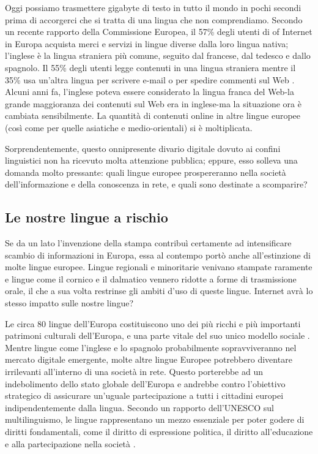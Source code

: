 \documentclass[]{../../metanetpaper}
\begin{document}
\begin{multicols}{2}


Oggi possiamo trasmettere gigabyte di testo in tutto il mondo in pochi secondi
prima di accorgerci che si tratta di una lingua che non comprendiamo. Secondo
un recente rapporto della Commissione Europea, il 57\% degli utenti di of
Internet in Europa acquista merci e servizi in lingue diverse dalla loro
lingua nativa; l'inglese \`{e} la lingua straniera pi\`{u} comune, seguito dal
francese, dal tedesco e dallo spagnolo. Il 55\% degli utenti legge contenuti
in una lingua straniera mentre il 35\% usa un'altra lingua per scrivere e-mail
o per spedire commenti sul Web \cite{EC1}. Alcuni anni fa, l'inglese poteva essere considerato la lingua franca del Web-la grande maggioranza dei contenuti sul Web era in inglese-ma la situazione ora \`{e} cambiata sensibilmente. La quantit\`{a} di contenuti online in altre lingue europee (cos\`{i} come per quelle asiatiche e medio-orientali) si \`{e} moltiplicata.

Sorprendentemente, questo onnipresente divario digitale dovuto ai confini linguistici non ha ricevuto molta attenzione pubblica; eppure, esso solleva una domanda molto pressante: quali lingue europee prospereranno nella societ\`{a} dell'informazione e della conoscenza in rete, e quali sono destinate a scomparire?

\subsection{Le nostre lingue a rischio}

Se da un lato l'invenzione della stampa contribu\`{i} certamente ad intensificare scambio di informazioni in Europa, essa al contempo port\`{o} anche all'estinzione di molte lingue europee. Lingue regionali e minoritarie venivano stampate raramente e lingue come il cornico e il dalmatico vennero ridotte a forme di trasmissione orale, il che a sua volta restrinse gli ambiti d'uso di queste lingue. Internet avr\`{a} lo stesso impatto sulle nostre lingue?


Le circa 80 lingue dell'Europa costituiscono uno dei pi\`{u} ricchi e pi\`{u}
importanti patrimoni culturali dell'Europa, e una parte vitale del suo unico
modello sociale \cite{EC2}. Mentre lingue come l'inglese e lo spagnolo
probabilmente sopravviveranno nel mercato digitale emergente, molte altre
lingue Europee potrebbero diventare irrilevanti all'interno di una societ\`{a}
in rete. Questo porterebbe ad un indebolimento dello stato globale dell'Europa
e andrebbe contro l'obiettivo strategico di assicurare un'uguale
partecipazione a tutti i cittadini europei indipendentemente dalla
lingua. Secondo un rapporto dell'UNESCO sul multilinguismo, le lingue
rappresentano un mezzo essenziale per poter godere di diritti fondamentali,
come il diritto di espressione politica, il diritto all'educazione e alla
partecipazione nella societ\`{a} \cite{Unesco1}.



\end{multicols}
\end{document}
